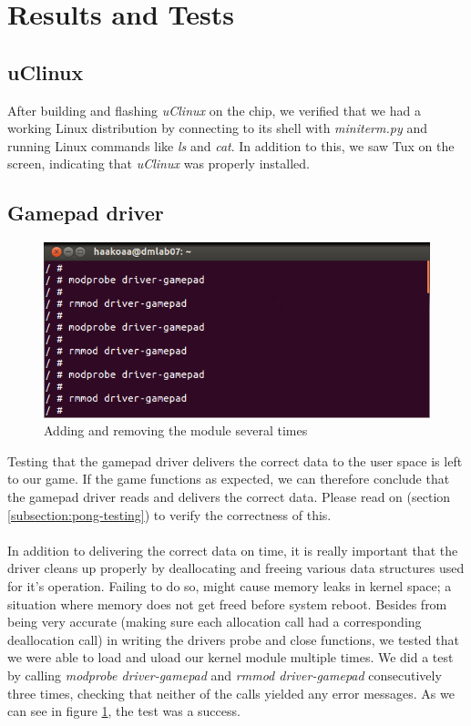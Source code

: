 \section{Results and Tests}
\subsection{uClinux}
After building and flashing \emph{uClinux} on the chip, we verified that we had a working Linux distribution by connecting to its shell with \emph{miniterm.py} and running Linux commands like \emph{ls} and \emph{cat}. In addition to this, we saw Tux on the screen, indicating that \emph{uClinux} was properly installed.

\subsection{Gamepad driver}
\begin{figure}[h]
	\centering
	\includegraphics[width=12cm]{img/modprobe.png}
	\caption{Adding and removing the module several times}
	\label{fig:modprobe}
\end{figure}
Testing that the gamepad driver delivers the correct data to the user space is left to our game. If the game functions as expected, we can therefore conclude that the gamepad driver reads and delivers the correct data. Please read on (section \ref{subsection:pong-testing}) to verify the correctness of this.\\
\\
In addition to delivering the correct data on time, it is really important that the driver cleans up properly by deallocating and freeing various data structures used for it's operation. Failing to do so, might cause memory leaks in kernel space; a situation where memory does not get freed before system reboot. Besides from being very accurate (making sure each allocation call had a corresponding deallocation call) in writing the drivers probe and close functions, we tested that we were able to load and uload our kernel module multiple times. We did a test by calling \emph{modprobe driver-gamepad} and \emph{rmmod driver-gamepad} consecutively three times, checking that neither of the calls yielded any error messages. As we can see in figure \ref{fig:modprobe}, the test was a success.

